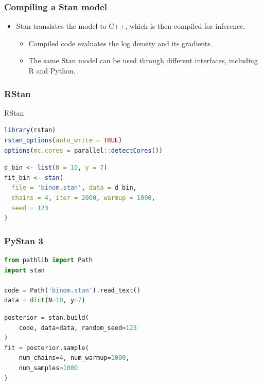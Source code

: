 \documentclass[10pt]{beamer}
\begin{document}

\begin{frame}

\frametitle{Compiling a Stan model}

  \begin{itemize}
  \item Stan translates the model to C++, which is then compiled for inference.
    \begin{itemize}
    \item Compiled code evaluates the log density and its gradients.
    \item The same Stan model can be used through different interfaces,
      including R and Python.
    \end{itemize}
  \end{itemize}

\end{frame}

\begin{frame}[fragile]

\frametitle{RStan}

  {\small\color{gray}
    {
      RStan
\begin{lstlisting}[language=R]
library(rstan)
rstan_options(auto_write = TRUE)
options(mc.cores = parallel::detectCores())
\end{lstlisting}
    }
{
\begin{lstlisting}[language=R]
d_bin <- list(N = 10, y = 7)
fit_bin <- stan(
  file = 'binom.stan', data = d_bin,
  chains = 4, iter = 2000, warmup = 1000,
  seed = 123
)
\end{lstlisting}
}
}
\end{frame}

\begin{frame}[fragile]

\frametitle{PyStan 3}

  {\small\color{gray}
{
\begin{lstlisting}[language=Python]
from pathlib import Path
import stan

code = Path('binom.stan').read_text()
data = dict(N=10, y=7)
\end{lstlisting}
    }
    {
\begin{lstlisting}[language=Python]
posterior = stan.build(
    code, data=data, random_seed=123
)
fit = posterior.sample(
    num_chains=4, num_warmup=1000,
    num_samples=1000
)
\end{lstlisting}
    }
  }
\end{frame}
\end{document}
